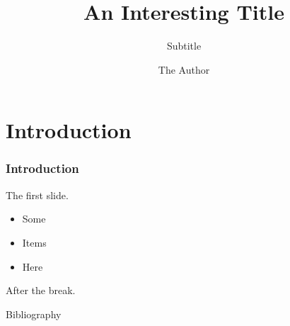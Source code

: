 \documentclass[]{beamer}
\title{An Interesting Title}
\subtitle{Subtitle}
\author{The Author}
\institute[UvA]{\texttt{[image: uva\_logo.pdf]}}
\begin{document}


\frame[plain]{
	\titlepage
}


\section[Outline]{}
\setcounter{tocdepth}{2}


\section{Introduction}


\begin{frame}

  \frametitle{Introduction}

  The first slide.

  \begin{itemize}
  	\item Some 
    \item Items
  	\item Here
  \end{itemize}

  \pause

  \begin{flushleft}
    After the break.
  \end{flushleft}

\end{frame}


\begin{frame}{Bibliography}	
  \tiny	
	
\end{frame}
\end{document}
